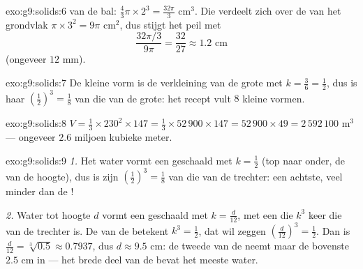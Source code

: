 \begin{solution}{exo:g9:solids:6}
 van de bal: $\frac43\pi \times 2^3 = \frac{32\pi}{3}$ cm$^3$. Die 
verdeelt zich over de  van het grondvlak $\pi \times 3^2 = 9\pi$
cm$^2$, dus stijgt het peil met
\[
\frac{32\pi/3}{9\pi} = \frac{32}{27} \approx 1.2 \text{ cm}
\]
(ongeveer $12$ mm).
\end{solution}

\begin{solution}{exo:g9:solids:7}
De kleine vorm is de verkleining van de grote met $k = \frac36 = \frac12$, dus is
haar  $\left(\frac12\right)^3 = \frac18$ van die van de grote: het recept
vult $8$ kleine vormen.
\end{solution}

\begin{solution}{exo:g9:solids:8}
$V = \frac13 \times 230^2 \times 147 = \frac13 \times 52\,900 \times 147
= 52\,900 \times 49 = 2\,592\,100$ m$^3$ --- ongeveer $2.6$ miljoen kubieke
meter.
\end{solution}

\begin{solution}{exo:g9:solids:9}
\emph{1.} Het water vormt een  geschaald met $k = \frac12$ (top naar onder,
de  van de hoogte), dus is zijn  $\left(\frac12\right)^3 = \frac18$ van
die van de trechter: een achtste, veel minder dan de !

\emph{2.} Water tot hoogte $d$ vormt een  geschaald met $k = \frac{d}{12}$,
met een  die $k^3$ keer die van de trechter is. De  van de 
betekent $k^3 = \frac12$, dat wil zeggen $\left(\frac{d}{12}\right)^3 = \frac12$.
Dan is $\frac{d}{12} = \sqrt[3]{0.5} \approx 0.7937$, dus $d \approx 9.5$ cm: de
tweede  van de  neemt maar de bovenste $2.5$ cm in --- het brede deel
van de  bevat het meeste water.
\end{solution}


